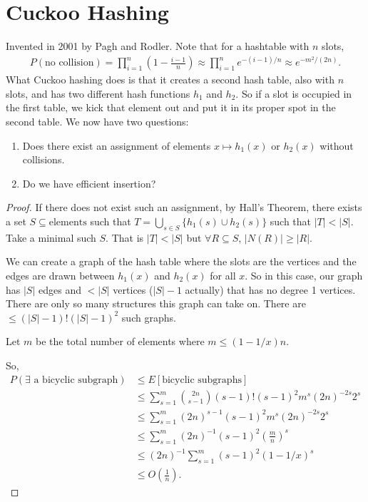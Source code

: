 \documentclass{report}
\begin{document}
\section{Cuckoo Hashing}
Invented in 2001 by Pagh and Rodler. Note that for a hashtable with $n$ slots, 
\begin{align*}
    P(\text{no collision}) = \prod_{i=1}^n \left( 1 - \frac{i-1}{n}\right) \approx \prod_{i=1}^n e^{-(i-1)/n} \approx e^{-m^2/(2n)}.
\end{align*}
What Cuckoo hashing does is that it creates a second hash table, also with $n$ slots, and has two different hash functions $h_1$ and $h_2$. So if a slot is occupied in the first table, we kick that element out and put it in its proper spot in the second table. We now have two questions:
\begin{enumerate}
    \item Does there exist an assignment of elements $x \mapsto h_1(x)$ or $h_2(x)$ without collisions.
    \item Do we have efficient insertion?
\end{enumerate}
\newpage
{}
\begin{proof}
    If there does not exist such an assignment, by Hall's Theorem, there exists a set $S \subseteq \text{elements}$ such that $T = \bigcup_{s \in S} \{h_1(s) \cup h_2(s)\}$ such that $|T| < |S|$. Take a minimal such $S$. That is $|T| < |S|$ but $\forall R \subseteq S$, $|N(R)| \geq |R|$.

    We can create a graph of the hash table where the slots are the vertices and the edges are drawn between $h_1(x)$ and $h_2(x)$ for all $x$. So in this case, our graph has $|S|$ edges and $<|S|$ vertices ($|S| - 1$ actually) that has no degree 1 vertices. There are only so many structures this graph can take on. There are $\leq (|S| -1)! (|S|-1)^2$ such graphs.

    Let $m$ be the total number of elements where $m \leq (1-1/x)n$.

    So,
    \begin{align*}
        P(\exists \text{ a bicyclic subgraph}) &\leq E[\text{bicyclic subgraphs}] \\
        &\leq \sum_{s=1}^m \binom{2n}{s-1}(s-1)!(s-1)^2 m^s (2n)^{-2s}2^s \\
        &\leq \sum_{s=1}^m  (2n)^{s-1} (s-1)^2 m^s (2n)^{-2s} 2^s \\
        &\leq \sum_{s=1}^m  (2n)^{-1} (s-1)^2 \left(\frac mn\right)^s \\
        &\leq (2n)^{-1} \sum_{s=1}^m  (s-1)^2(1- 1/x)^s\\
        &\leq O\left(\frac 1n\right).
    \end{align*}
\end{proof}
\end{document}
